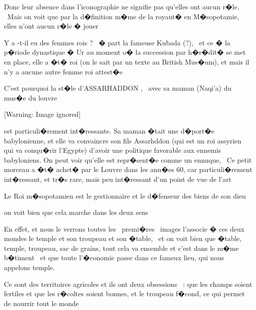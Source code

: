 \documentclass{article}
\begin{document}
\bigskip

Donc leur absence dans l'iconographie ne signifie pas qu'elles ont aucun r�le, \ Mais on voit que par la d�finition m�me de la royaut� en M�sopotamie, elles n'ont aucun r�le � jouer


\bigskip

Y a -t-il eu des femmes rois ? \ � part la fameuse Kubada (?), \ et ce � la p�riode dynastique � Ur au moment o� la succession par h�r�dit� se met en place, elle a �t� roi (on le sait par un texte au British Mus�um), et mais il n'y a aucune autre femme roi attest�e


\bigskip

C'est pourquoi la st�le d'ASSARHADDON , \ avec sa maman (Naqi'a) du mus�e du louvre 


\bigskip


\bigskip

  [Warning: Image ignored] %
 


\bigskip

est particuli�rement int�ressante. Sa maman �tait une d�port�e babylonienne, et elle va convaincre son fils Assarhddon (qui est un roi assyrien qui va conqu�rir l'Egypte) d'avoir une politique favorable aux ennemis babyloniens. On peut voir qu'elle est repr�sent�e comme un ennuque, \ Ce petit morceau a �t� achet� par le Louvre dans les ann�es 60, car particuli�rement int�ressant, et tr�s rare, mais peu int�ressant d'un point de vue de l'art


\bigskip

Le Roi m�sopotamien est le gestionnaire et le d�fenseur des biens de son dieu


\bigskip

on voit bien que cela marche dans les deux sens

En effet, et nous le verrons toutes les \ premi�res \ images l'associe � ces deux mondes le temple et son troupeau et son �table, \ et on voit bien que �table, temple, troupeau, sac de grains, tout cela va ensemble et c'est dans le m�me b�timent \ et que toute l'�conomie passe dans ce fameux lieu, qui nous appelons temple.


\bigskip

Ce sont des territoires agricoles et ils ont deux obsessions \ : que les champs soient fertiles et que les r�coltes soient bonnes, et le troupeau f�cond, ce qui permet de nourrir tout le monde
\end{document}
